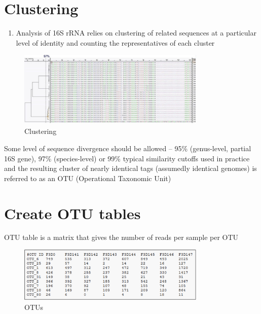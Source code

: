 \documentclass[
]{book}
\providecommand{\tightlist}{%
  \setlength{\itemsep}{0pt}\setlength{\parskip}{0pt}}
\begin{document}
\hypertarget{clustering}{%
\section{Clustering}\label{clustering}}

\begin{enumerate}
\def\labelenumi{\arabic{enumi}.}
\tightlist
\item
  Analysis of 16S rRNA relies on clustering of related sequences at a particular level of identity and counting the representatives of each cluster
\end{enumerate}

\begin{figure}
\centering
\includegraphics[width=0.8\textwidth,height=\textheight]{./Figures/Cluster.png}
\caption{Clustering}
\end{figure}

Some level of sequence divergence should be allowed -- 95\% (genus-level, partial 16S gene), 97\% (species-level) or 99\% typical similarity cutoffs used in
practice and the resulting cluster of nearly identical tags (assumedly identical genomes) is referred to as an OTU (Operational Taxonomic Unit)

\hypertarget{create-otu-tables}{%
\section{Create OTU tables}\label{create-otu-tables}}

OTU table is a matrix that gives the number of reads per sample per OTU

\begin{figure}
\centering
\includegraphics[width=0.8\textwidth,height=\textheight]{./Figures/OTU.png}
\caption{OTUs}
\end{figure}
\end{document}
